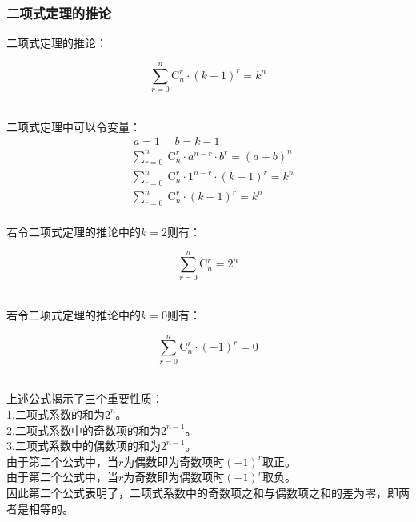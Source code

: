 \documentclass[UTF8]{ctexart}
\newcommand{\Co}{\mathrm{C}}
\begin{document}
\newpage

\subsubsection{二项式定理的推论}
    二项式定理的推论：
    \begin{large}
        \begin{equation*}
            \sum_{r=0}^n\Co_n^r\cdot(k-1)^r=k^n
        \end{equation*}
    \end{large}\\
    二项式定理中可以令变量：\vspace{3pt}
    \begin{align}
        &~a=1~~~~~~b=k-1\\[3mm]
        &\sum_{r=0}^{n}~\Co_n^r\cdot a^{n-r}\cdot b^r=(a+b)^n\\[3mm]
        &\sum_{r=0}^{n}~\Co_n^r\cdot 1^{n-r}\cdot (k-1)^r=k^n\\[3mm]
        &\sum_{r=0}^{n}~\Co_n^r\cdot (k-1)^r=k^n
    \end{align}\\
    若令二项式定理的推论中的$k=2$则有：
    \begin{large}
        \begin{equation*}
            \sum_{r=0}^n\Co_n^r=2^n
        \end{equation*}
    \end{large}\\
    若令二项式定理的推论中的$k=0$则有：
    \begin{large}
        \begin{equation*}
            \sum_{r=0}^n\Co_n^r\cdot(-1)^r=0
        \end{equation*}
    \end{large}\\
    上述公式揭示了三个重要性质：\\[3mm]
    1.二项式系数的和为$2^n$。\\[3mm]
    2.二项式系数中的奇数项的和为$2^{n-1}$。\\[3mm]
    3.二项式系数中的偶数项的和为$2^{n-1}$。\\[6mm]
    由于第二个公式中，当$r$为偶数即为奇数项时$(-1)^r$取正。\\[3mm]
    由于第二个公式中，当$r$为奇数即为偶数项时$(-1)^r$取负。\\[3mm]
    因此第二个公式表明了，二项式系数中的奇数项之和与偶数项之和的差为零，即两者是相等的。

\newpage
\end{document}
